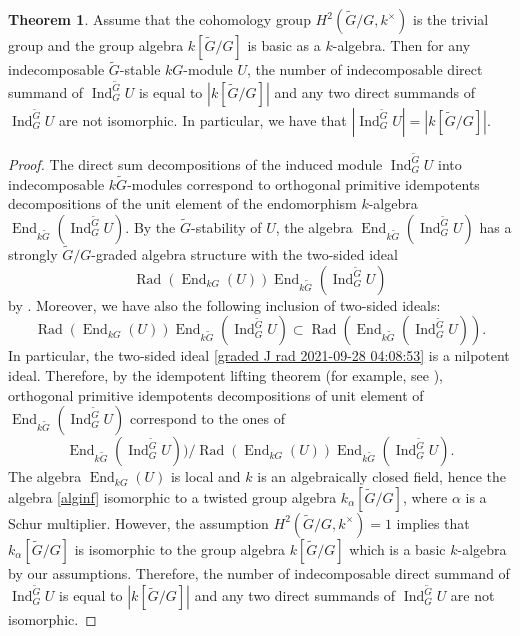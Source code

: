 \documentclass[pdftex,a4paper]{article}
\numberwithin{equation}{subsection}
\theoremstyle{definition}
\newtheorem{theorem}{Theorem}[section]
\newcommand{\Rad}{{\operatorname{Rad}\nolimits}}
\newcommand{\End}{\operatorname{End}\nolimits}
\newcommand{\induc}{{\operatorname{Ind}\nolimits}}
\begin{document}
\begin{theorem}\label{induc dsmmand number 2021-09-07 10:26:20}
	Assume that the cohomology group \(H^2(\tilde{G}/G,k^\times)\) is the trivial group and the group algebra \(k[\tilde{G}/G]\) is basic as a \(k\)-algebra. Then for any indecomposable \(\tilde{G}\)-stable \(kG\)-module \(U\), the number of indecomposable direct summand of \(\induc_G^{\tilde{G}} U\) is equal to \(|k[\tilde{G}/G]|\) and any two direct summands of \(\induc_G^{\tilde{G}} U\) are not isomorphic.
	In particular, we have that \(|\induc_G^{\tilde{G}} U|=|k[\tilde{G}/G]|\).
\end{theorem}
\begin{proof}
	The direct sum decompositions of the induced module \(\induc_G^{\tilde{G}}U\) into indecomposable \(k\tilde{G}\)-modules correspond to orthogonal primitive idempotents decompositions of the unit element of the endomorphism \(k\)-algebra \(\End_{k\tilde{G}}(\induc_G^{\tilde{G}} U)\).
	By the \(\tilde{G}\)-stability of \(U\), the algebra \(\End_{k\tilde{G}}(\induc_G^{\tilde{G}} U)\) has a strongly \(\tilde{G}/G\)-graded algebra structure with the two-sided ideal
	\begin{equation}\label{graded J rad 2021-09-28 04:08:53}
		\Rad(\End_{kG}(U))\End_{k\tilde{G}}(\induc_G^{\tilde{G}} U)
	\end{equation}
	by \cite[Lemma 4.6.5, Theorem 4.6.7]{MR998775}.
	Moreover, we have also the following inclusion of two-sided ideals:
	\begin{equation}
		\Rad(\End_{kG}(U))\End_{k\tilde{G}}(\induc_G^{\tilde{G}} U)\subset \Rad(\End_{k\tilde{G}}(\induc_G^{\tilde{G}} U)).
	\end{equation}
	In particular, the two-sided ideal \eqref{graded J rad 2021-09-28 04:08:53} is a nilpotent ideal.
	Therefore, by the idempotent lifting theorem (for example, see \cite[Theorem 1.4.10]{MR998775}), orthogonal primitive idempotents decompositions of unit element of \(\End_{k\tilde{G}}(\induc_G^{\tilde{G}} U)\) correspond to the ones of
	\begin{equation}\label{alginf}
		\End_{k\tilde{G}}(\induc_G^{\tilde{G}} U))/\Rad(\End_{kG}(U))\End_{k\tilde{G}}(\induc_G^{\tilde{G}} U).
	\end{equation}
	The algebra \(\End_{kG}(U)\) is local and \(k\) is an algebraically closed field, hence the algebra \eqref{alginf} isomorphic to a twisted group algebra \(k_\alpha[\tilde{G}/G]\), where \(\alpha\) is a Schur multiplier.
	However, the assumption \(H^2(\tilde{G}/G,k^\times)=1\) implies that \(k_\alpha[\tilde{G}/G]\) is isomorphic to the group algebra \(k[\tilde{G}/G]\) which is a basic \(k\)-algebra by our assumptions.
	Therefore, the number of indecomposable direct summand of \(\induc_G^{\tilde{G}} U\) is equal to \(|k[\tilde{G}/G]|\) and any two direct summands of \(\induc_G^{\tilde{G}} U\) are not isomorphic.
\end{proof}
\end{document}
